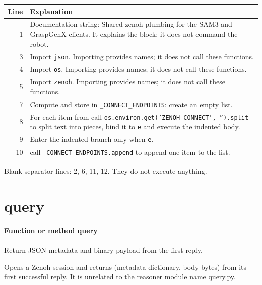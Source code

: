 \documentclass[11pt,a4paper]{book}
\begin{document}
\begin{longtable}{r p{}}

\textbf{Line} & \textbf{Explanation} \\ \hline \endhead

1 & Documentation string: Shared zenoh plumbing for the SAM3 and GraspGenX clients. It explains the block; it does not command the robot. \\

3 & Import \texttt{json}. Importing provides names; it does not call these functions. \\

4 & Import \texttt{os}. Importing provides names; it does not call these functions. \\

5 & Import \texttt{zenoh}. Importing provides names; it does not call these functions. \\

7 & Compute and store in \texttt{\_CONNECT\_ENDPOINTS}: create an empty list.  \\

8 & For each item from call \texttt{os.environ.get('ZENOH\_CONNECT', '').split} to split text into pieces, bind it to \texttt{e} and execute the indented body. \\

9 & Enter the indented branch only when \texttt{e}. \\

10 & call \texttt{\_CONNECT\_ENDPOINTS.append} to append one item to the list. \\

\end{longtable}

Blank separator lines: 2, 6, 11, 12. They do not execute anything.

\section{query}

\paragraph{Function or method query}
Return JSON metadata and binary payload from the first reply.

Opens a Zenoh session and returns (metadata dictionary, body bytes) from its first successful reply. It is unrelated to the reasoner module name query.py.
\end{document}
